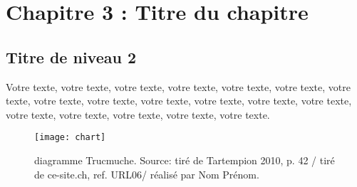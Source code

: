 \chapter{Chapitre 3 : Titre du chapitre}


\section{Titre de niveau 2}

Votre texte, votre texte, votre texte, votre texte, votre texte, votre texte, votre texte, votre texte, votre texte, votre texte, votre texte, votre texte, votre texte, votre texte, votre texte, votre texte, votre texte, votre texte.

\begin{figure}[tbph!]
	\centering
	\texttt{[image: chart]}
	\caption[Diagramme Trucmuche.]{diagramme Trucmuche. Source: tiré de Tartempion 2010, p. 42 / tiré de ce-site.ch, ref. URL06/ réalisé par Nom Prénom.}
	\label{fig:chart4}
\end{figure}